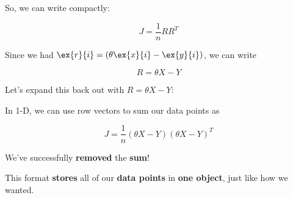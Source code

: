         So, we can write compactly:
        
        \begin{equation}
            J = \frac{1}{n} RR^T
        \end{equation}

        Since we had $\ex{r}{i} = (\theta \ex{x}{i} - \ex{y}{i} )$, we can write 
        
        \begin{equation}
            R = \theta X - Y
        \end{equation}
        
        Let's expand this back out with $R = \theta X - Y$:\\
        
        \begin{concept}
            In 1-D, we can use row vectors to sum our data points as
            
            \begin{equation*}
                J = \frac{1}{n} (\theta X - Y)(\theta X - Y)^T
            \end{equation*}
        \end{concept}
        
        We've successfully \textbf{removed} the \textbf{sum}!
        
        This format \textbf{stores} all of our \textbf{data points} in \textbf{one object}, just like how we wanted.
        